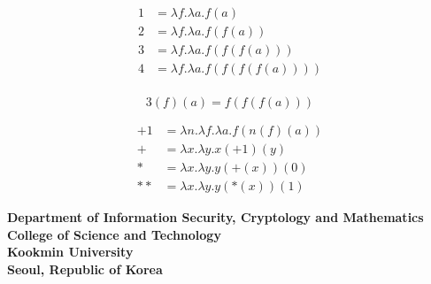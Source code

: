 \documentclass[11pt,openany]{article}
\newcommand{\footer}[1]{
\begin{flushright}
	\vspace{2em}
	\vspace{1em}
	\textcolor{TealBlue2}{\small\textbf{#1}}
\end{flushright}
}
\begin{document}
\begin{align*}
	1&=\lambda f.\lambda a.f(a)\\
	2&=\lambda f.\lambda a.f(f(a))\\
	3&=\lambda f.\lambda a.f(f(f(a)))\\
	4&=\lambda f.\lambda a.f(f(f(f(a))))\\
\end{align*}

\[
3(f)(a)=f(f(f(a)))
\]

\begin{align*}
	+1 &= \lambda n.\lambda f.\lambda a. f(n(f)(a))\\
	+ &= \lambda x.\lambda y.x(+1)(y)\\
	* &=\lambda x.\lambda y.y(+(x))(0) \\
	** &=\lambda x.\lambda y.y(*(x))(1)
\end{align*}

\newpage
\footer{Department of Information Security, Cryptology and Mathematics\\
	College of Science and Technology\\
	Kookmin University \\
	Seoul, Republic of Korea}

\newpage

%
%
\end{document}
